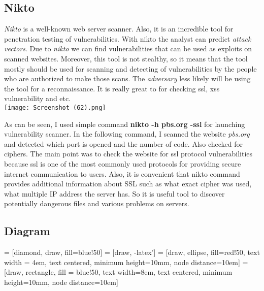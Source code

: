 \documentclass[12pt, letterpaper, twoside]{article}
\begin{document}
\subsection{Nikto}
\textit{Nikto} is a well-known web server scanner. Also, it is an incredible tool for penetration testing of vulnerabilities. With nikto the analyst can predict \textit{attack vectors}. Due to \textit{nikto} we can find vulnerabilities that can be used as exploits on scanned websites. Moreover, this tool is not stealthy, so it means that the tool mostly should be used for scanning and detecting of vulnerabilities by the people who are authorized to make those scans. The \textit{adversary} less likely will be using the tool for a reconnaissance. It is really great to for checking ssl, xss vulnerability and etc.\cite{TechBeacon} \\
\texttt{[image: Screenshot (62).png]}\break

As can be seen, I used simple command \textbf{nikto -h pbs.org -ssl} for launching vulnerability scanner. In the following command, I scanned the website \textit{pbs.org} and detected which port is opened and the number of code. Also checked for ciphers. The main point was to check the website for ssl protocol vulnerabilities because ssl is one of the most commonly used protocols for providing secure internet communication to users. Also, it is convenient that nikto command provides additional information about SSL such as what exact cipher was used, what multiple IP address the server has. So it is useful tool to discover potentially dangerous files and various problems on servers.

\newpage 
\subsection{Diagram} \cite{ExpertInsights}

 = [diamond, draw, fill=blue!50]
 = [draw, -latex']
 = [draw, ellipse, fill=red!50, text width = 4em, text centered, minimum height=10mm, node distance=10em]
 = [draw, rectangle, fill = blue!50, text width=8em, text centered, minimum height=10mm, node distance=10em]
\end{document}
